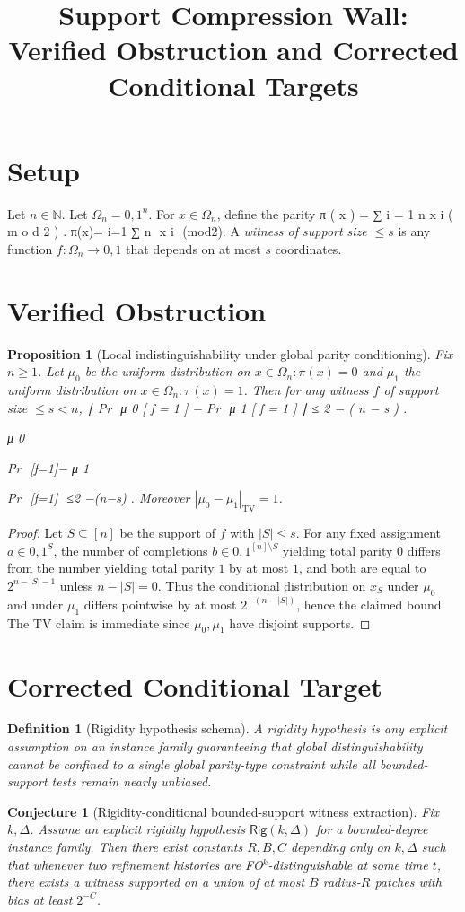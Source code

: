 \documentclass{article}
\newtheorem{proposition}{Proposition}
\newtheorem{definition}{Definition}
\newtheorem{conjecture}{Conjecture}
\begin{document}
\title{Support Compression Wall: Verified Obstruction and Corrected Conditional Targets}
\author{}
\date{}
\maketitle
\section*{Setup}
Let $n\in \mathbb{N}$. Let $\Omega_n={0,1}^n$.
For $x\in \Omega_n$, define the parity
π
(
x
)
=
∑
i
=
1
n
x
i
(
m
o
d
2
)
.
π(x)= 
i=1
∑
n
​	
 x 
i
​	
 (mod2).
A \emph{witness of support size} $\le s$ is any function $f:\Omega_n\to{0,1}$ that depends on at most $s$ coordinates.
\section*{Verified Obstruction}
\begin{proposition}[Local indistinguishability under global parity conditioning]
Fix $n\ge 1$. Let $\mu_0$ be the uniform distribution on ${x\in\Omega_n:\pi(x)=0}$ and
$\mu_1$ the uniform distribution on ${x\in\Omega_n:\pi(x)=1}$.
Then for any witness $f$ of support size $\le s<n$,
∣
Pr
⁡
μ
0
[
f
=
1
]
−
Pr
⁡
μ
1
[
f
=
1
]
∣
≤
2
−
(
n
−
s
)
.
​	
  
μ 
0
​	
 
Pr
​	
 [f=1]− 
μ 
1
​	
 
Pr
​	
 [f=1] 
​	
 ≤2 
−(n−s)
 .
Moreover $|\mu_0-\mu_1|_{\mathrm{TV}}=1$.
\end{proposition}
\begin{proof}
Let $S\subseteq [n]$ be the support of $f$ with $|S|\le s$.
For any fixed assignment $a\in{0,1}^S$, the number of completions $b\in{0,1}^{[n]\setminus S}$
yielding total parity $0$ differs from the number yielding total parity $1$ by at most $1$,
and both are equal to $2^{n-|S|-1}$ unless $n-|S|=0$.
Thus the conditional distribution on $x_S$ under $\mu_0$ and under $\mu_1$ differs pointwise by at most
$2^{-(n-|S|)}$, hence the claimed bound.
The TV claim is immediate since $\mu_0,\mu_1$ have disjoint supports.
\end{proof}
\section*{Corrected Conditional Target}
\begin{definition}[Rigidity hypothesis schema]
A rigidity hypothesis is any explicit assumption on an instance family guaranteeing that global distinguishability cannot be confined to a single global parity-type constraint while all bounded-support tests remain nearly unbiased.
\end{definition}
\begin{conjecture}[Rigidity-conditional bounded-support witness extraction]
Fix $k,\Delta$. Assume an explicit rigidity hypothesis $\mathsf{Rig}(k,\Delta)$ for a bounded-degree instance family.
Then there exist constants $R,B,C$ depending only on $k,\Delta$ such that whenever two refinement histories are FO$^k$-distinguishable at some time $t$,
there exists a witness supported on a union of at most $B$ radius-$R$ patches with bias at least $2^{-C}$.
\end{conjecture}
\end{document}
